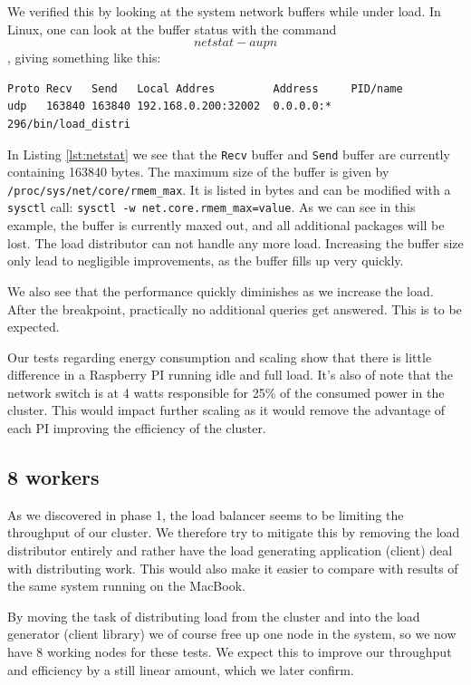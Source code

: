 We verified this by looking at the system network buffers while under load. In Linux, one can look at the buffer status with the command $$netstat -aupn$$, giving something like this:
\begin{lstlisting}[caption={Output of {\tt netstat -aupn | grep 32002}},captionpos=b,label={lst:netstat}]
Proto Recv   Send   Local Addres         Address     PID/name
udp   163840 163840 192.168.0.200:32002  0.0.0.0:*   296/bin/load_distri
\end{lstlisting}
In Listing \ref{lst:netstat} we see that the {\tt Recv} buffer and {\tt Send} buffer are currently containing 163840 bytes.
The maximum size of the buffer is given by {\tt /proc/sys/net/core/rmem\_max}. It is listed in bytes and can be modified with a {\tt sysctl} call: {\tt sysctl -w net.core.rmem\_max=value}.
As we can see in this example, the buffer is currently maxed out, and all additional packages will be lost. The load distributor can not handle any more load. Increasing the buffer size only lead to negligible improvements, as the buffer fills up very quickly.

We also see that the performance quickly diminishes as we increase the load. After the breakpoint, practically no additional queries get answered.
This is to be expected.

Our tests regarding energy consumption and scaling show that there is little difference in a Raspberry PI running idle and full load.
It's also of note that the network switch is at 4 watts responsible for 25\% of the consumed power in the cluster.
This would impact further scaling as it would remove the advantage of each PI improving the efficiency of the cluster.

\subsection{8 workers}
As we discovered in phase 1, the load balancer seems to be limiting the throughput of our cluster.
We therefore try to mitigate this by removing the load distributor entirely and rather have the load generating application (client) deal with distributing work.
This would also make it easier to compare with results of the same system running on the MacBook.

By moving the task of distributing load from the cluster and into the load generator (client library) we of course free up one node in the system, so we now have 8 working nodes for these tests. We expect this to improve our throughput and efficiency by a still linear amount, which we later confirm.

